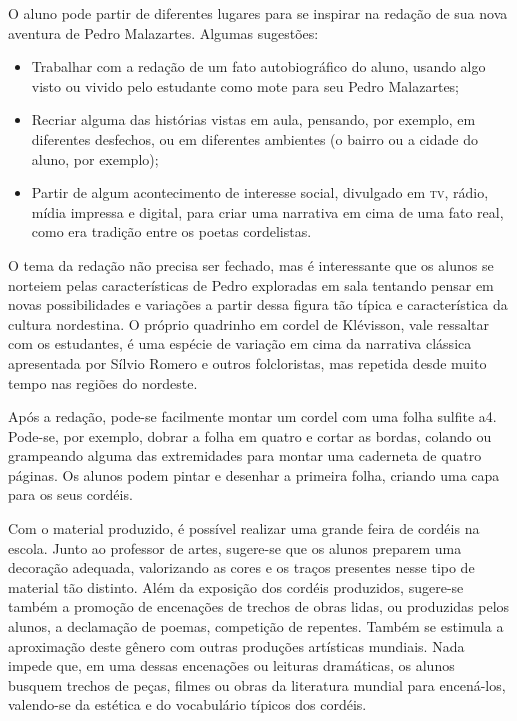 \documentclass[11pt]{extarticle}
\begin{document}
O aluno pode partir de diferentes lugares para se inspirar na redação de sua nova aventura de Pedro Malazartes. 
Algumas sugestões:

\begin{itemize}
\item Trabalhar com a redação de um fato autobiográfico do aluno, usando algo visto ou vivido pelo estudante como mote para seu Pedro Malazartes;

\item Recriar alguma das histórias vistas em aula, pensando, por exemplo, em diferentes desfechos, ou em diferentes ambientes (o bairro ou a cidade do aluno, por exemplo);

\item Partir de algum acontecimento de interesse social, divulgado em \textsc{tv}, rádio, mídia impressa e digital, para criar uma narrativa em cima de uma fato real, como era tradição entre os poetas cordelistas.
\end{itemize}

O tema da redação não precisa ser fechado, mas é interessante que os alunos se norteiem pelas características de Pedro exploradas em sala tentando pensar em novas possibilidades e variações a partir dessa figura tão típica e característica da cultura nordestina.
O próprio quadrinho em cordel de Klévisson, vale ressaltar com os estudantes, é uma espécie de variação em cima da narrativa clássica apresentada por Sílvio Romero e outros folcloristas, mas repetida desde muito tempo nas regiões do nordeste.

Após a redação, pode-se facilmente montar um cordel com uma folha sulfite a4. 
Pode-se, por exemplo, dobrar a folha em quatro e cortar as bordas, colando ou grampeando alguma das extremidades para montar uma caderneta de quatro páginas.
Os alunos podem pintar e desenhar a primeira folha, criando uma capa para os seus cordéis.

Com o material produzido, é possível realizar uma grande
feira de cordéis na escola. Junto ao professor de artes, sugere-se que
os alunos preparem uma decoração adequada, valorizando as cores e os
traços presentes nesse tipo de material tão distinto. Além da exposição
dos cordéis produzidos, sugere-se também a promoção de encenações de
trechos de obras lidas, ou produzidas pelos alunos, a declamação de
poemas, competição de repentes. Também se estimula a aproximação deste
gênero com outras produções artísticas mundiais. Nada impede que, em uma
dessas encenações ou leituras dramáticas, os alunos busquem trechos
de peças, filmes ou obras da literatura mundial para encená-los, valendo-se
da estética e do vocabulário típicos dos cordéis.
\end{document}
